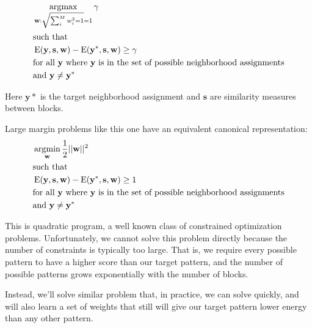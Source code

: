 %
\begin{align*}
&\operatorname*{\arg\!\max}_{\mathbf{w}:\sqrt{\sum_i^M w_i^2 = 1}=1} \mathbf{\gamma} \\
&\text{such that} \\
&\operatorname{E}(\mathbf{y}, \mathbf{s}, \mathbf{w})
- \operatorname{E}(\mathbf{y}^*, \mathbf{s}, \mathbf{w}) \geq \gamma\\ 
&\text{for all } \mathbf{y} \text{ where } \mathbf{y} \text{ is in the set of
  possible neighborhood assignments}\\
&\text{and } \mathbf{y} \neq \mathbf{y}^*
\end{align*}
%

Here $\mathbf{y}*$ is the target neighborhood assignment and $\mathbf{s}$
are similarity measures between blocks. 

Large margin problems like this one have an equivalent canonical
representation: 
%
\begin{align*}
&\operatorname*{\arg\!\min}_{\mathbf{w}} \frac{1}{2}||\mathbf{w}||^2 \\
&\text{such that} \\
&\operatorname{E}(\mathbf{y}, \mathbf{s}, \mathbf{w})
- \operatorname{E}(\mathbf{y}^*, \mathbf{s}, \mathbf{w}) \geq 1 \\ 
&\text{for all } \mathbf{y} \text{ where } \mathbf{y} \text{ is in the set of
  possible neighborhood assignments}\\
&\text{and } \mathbf{y} \neq \mathbf{y}^*
\end{align*}

This is quadratic program, a well known class of constrained
optimization problems. Unfortunately, we cannot solve this problem
directly because the number of constraints is typically too
large. That is, we require every possible pattern to have a
higher score than our target pattern, and the number of possible
patterns grows exponentially with the number of blocks.

Instead, we'll solve similar problem that, in practice, we can solve
quickly, and will also learn a set of weights that still will give our
target pattern lower energy than any other
pattern.\cite{szummer_learning_2008}
 

